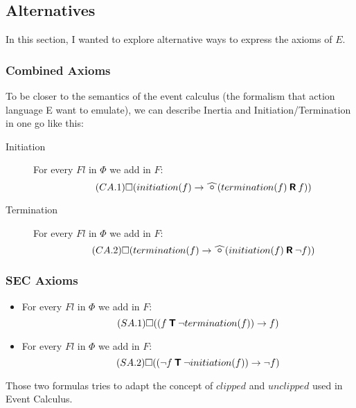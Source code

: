 \subsection{Alternatives}

In this section, I wanted to explore alternative ways to express the axioms of $E$.

\subsubsection{Combined Axioms}

To be closer to the semantics of the event calculus (the formalism that action language E want to emulate), we can describe Inertia and Initiation/Termination in one go like this:
\begin{description}
  \item[Initiation]
  For every $Fl$ in $\Phi$ we add in $F$:
  \begin{equation}\tag{$CA.1$}
    \alwaysF(initiation(f)\rightarrow\wnext(termination(f) \release f))
  \end{equation}
  \item[Termination]
  For every $Fl$ in $\Phi$ we add in $F$:
  \begin{equation}\tag{$CA.2$}
    \alwaysF(termination(f)\rightarrow\wnext(initiation(f) \release \neg f))
  \end{equation}
\end{description}

\subsubsection{SEC Axioms}

\begin{itemize}
  \item
    For every $Fl$ in $\Phi$ we add in $F$:
    \begin{equation}\tag{$SA.1$}
      \square((f \mathbin{\bm{\mathsf{T}}} \neg termination(f)) \rightarrow f)
    \end{equation}
  \item
    For every $Fl$ in $\Phi$ we add in $F$:
    \begin{equation}\tag{$SA.2$}
      \square((\neg f \mathbin{\bm{\mathsf{T}}} \neg initiation(f)) \rightarrow \neg f)
    \end{equation}
\end{itemize}

Those two formulas tries to adapt the concept of $clipped$ and $unclipped$ used in Event Calculus.


